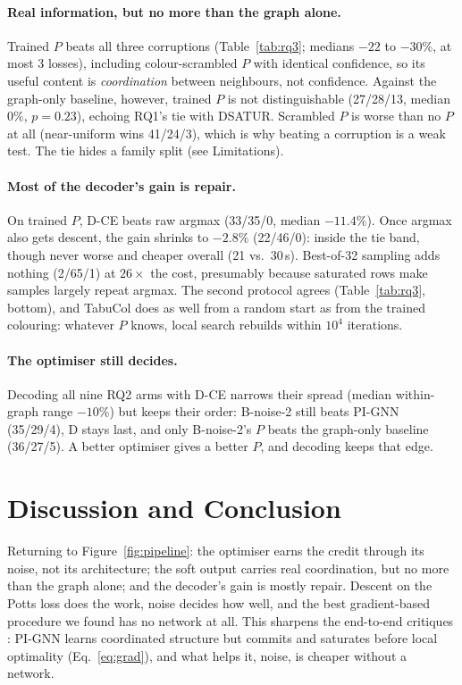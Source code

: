 \documentclass[11pt]{article}
\begin{document}
\paragraph{Real information, but no more than the graph alone.} Trained $P$
beats all three corruptions (Table~\ref{tab:rq3}; medians $-22$ to $-30\%$, at
most 3 losses), including colour-scrambled $P$ with identical confidence, so
its useful content is \emph{coordination} between neighbours, not confidence. Against the graph-only baseline, however, trained $P$ is not
distinguishable (27/28/13, median $0\%$, $p=0.23$), echoing RQ1's tie with
DSATUR. Scrambled $P$ is worse than no $P$ at all (near-uniform wins 41/24/3),
which is why beating a corruption is a weak test. The tie hides a family
split (see Limitations).

\paragraph{Most of the decoder's gain is repair.} On trained $P$, D-CE beats
raw argmax (33/35/0, median $-11.4\%$). Once argmax also gets descent, the gain
shrinks to $-2.8\%$ (22/46/0): inside the tie band, though never worse and
cheaper overall (21 vs.\ 30\,s). Best-of-32 sampling adds nothing (2/65/1) at
$26\times$ the cost, presumably because saturated rows make samples largely
repeat argmax. The second protocol agrees (Table~\ref{tab:rq3}, bottom), and
TabuCol does as well from a random start as from the trained colouring:
whatever $P$ knows, local search rebuilds within $10^4$ iterations.

\paragraph{The optimiser still decides.} Decoding all nine RQ2 arms with D-CE
narrows their spread (median within-graph range $-10\%$) but keeps their
order: B-noise-2 still beats PI-GNN (35/29/4), D stays last, and only
B-noise-2's $P$ beats the graph-only baseline (36/27/5). A better optimiser
gives a better $P$, and decoding keeps that edge.

\section{Discussion and Conclusion}

Returning to Figure~\ref{fig:pipeline}: the optimiser earns the credit
through its noise, not its architecture; the soft output carries real
coordination, but no more than the graph alone; and the decoder's gain is
mostly repair. Descent on the Potts loss does the work, noise decides how well,
and the best gradient-based procedure we found has no network at all. This
sharpens the end-to-end critiques
\cite{angelini2023cautionary,boettcher2023inability}: PI-GNN learns
coordinated structure but commits and saturates before local optimality
(Eq.~\ref{eq:grad}), and what helps it, noise, is cheaper without a network.
\end{document}
